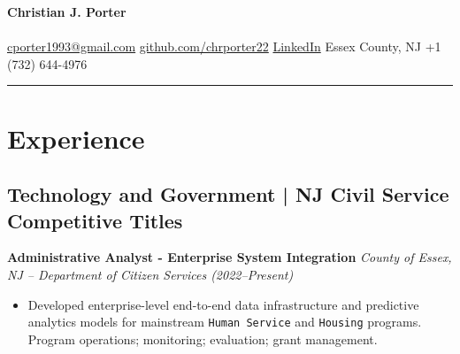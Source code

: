 \documentclass[11pt,a4paper]{article} \usepackage[a4paper,margin=1.2cm]{geometry}
\newcommand{\name}{\textbf{\Large Christian J. Porter}}
\begin{document}
\pagestyle{empty}

\begin{center}
  {\small \name} \\[-0.2em]
  {\titletext} \\[-0.1em]
  {\href{mailto:cporter1993@gmail.com}{cporter1993@gmail.com} \quad
  \href{https://github.com/chrporter22}{github.com/chrporter22} \quad
  \href{https://www.linkedin.com/in/christian-j-porter/}{LinkedIn} \quad
  Essex County, NJ \quad
  +1 (732) 644-4976}
\end{center}

\vspace{0.5mm}
\hrule
\vspace{0.5mm}

\section*{Experience}

\subsection*{Technology and Government | NJ Civil Service Competitive Titles}

\par\noindent\textbf{Administrative Analyst - Enterprise System Integration}  
\newline\textit{County of Essex, NJ – Department of Citizen Services (2022–Present)}  
\begin{itemize}
  \item Developed enterprise-level end-to-end data infrastructure and predictive
      analytics models for mainstream \texttt{Human Service} and \texttt{Housing}
      programs. Program operations; monitoring; evaluation; grant management.
\end{itemize}
\end{document}
